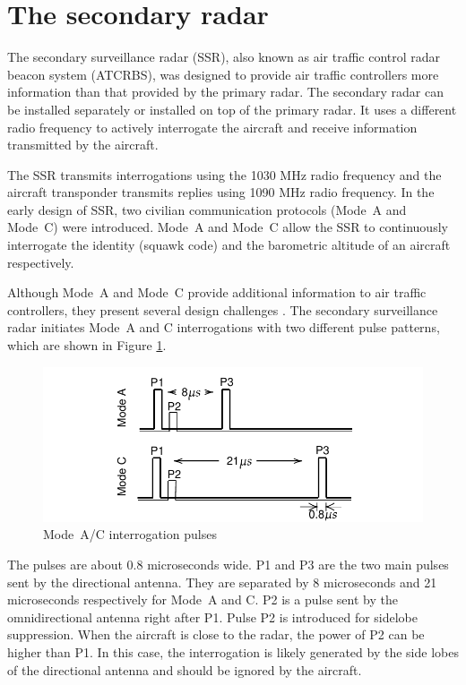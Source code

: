 \section{The secondary radar}

The secondary surveillance radar (SSR), also known as air traffic control radar beacon system (ATCRBS), was designed to provide air traffic controllers more information than that provided by the primary radar. The secondary radar can be installed separately or installed on top of the primary radar. It uses a different radio frequency to actively interrogate the aircraft and receive information transmitted by the aircraft.

The SSR transmits interrogations using the 1030 MHz radio frequency and the aircraft transponder transmits replies using 1090 MHz radio frequency. In the early design of SSR, two civilian communication protocols (Mode~A and Mode~C) were introduced. Mode~A and Mode~C allow the SSR to continuously interrogate the identity (squawk code) and the barometric altitude of an aircraft respectively.

Although Mode~A and Mode~C provide additional information to air traffic controllers, they present several design challenges \cite{icao1983}. The secondary surveillance radar initiates Mode~A and C interrogations with two different pulse patterns, which are shown in Figure \ref{fig:mode_ac_uplink_pulses}.

\begin{figure}[ht]
  \includegraphics[scale=0.8]{figures/intro/mode_ac_uplink_pulses.pdf}
  \caption{Mode~A/C interrogation pulses}
  \label{fig:mode_ac_uplink_pulses}
\end{figure}

The pulses are about 0.8 microseconds wide. P1 and P3 are the two main pulses sent by the directional antenna. They are separated by 8 microseconds and 21 microseconds respectively for Mode~A and C. P2 is a pulse sent by the omnidirectional antenna right after P1. Pulse P2 is introduced for sidelobe suppression. When the aircraft is close to the radar, the power of P2 can be higher than P1. In this case, the interrogation is likely generated by the side lobes of the directional antenna and should be ignored by the aircraft.

